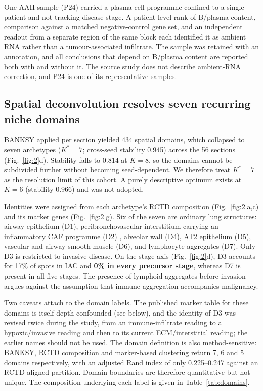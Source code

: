 One AAH sample (P24) carried a plasma-cell programme confined to a single patient and not
tracking disease stage. A patient-level rank of B/plasma content, comparison against a
matched negative-control gene set, and an independent readout from a separate region of the
same block each identified it as ambient RNA rather than a tumour-associated infiltrate. The
sample was retained with an annotation, and all conclusions that depend on B/plasma content
are reported both with and without it. The source study does not describe ambient-RNA
correction, and P24 is one of its representative samples.



\subsection{Spatial deconvolution resolves seven recurring niche domains}

BANKSY applied per section yielded 434 spatial domains, which collapsed to seven archetypes
($K^{*}=7$; cross-seed stability 0.945) across the 56 sections (Fig.~\ref{fig:2}d).
Stability falls to 0.814 at $K=8$, so the domains cannot be subdivided further without
becoming seed-dependent. We therefore treat $K^{*}=7$ as the resolution limit of this
cohort. A purely descriptive optimum exists at $K=6$ (stability 0.966) and was not adopted.

Identities were assigned from each archetype's RCTD composition (Fig.~\ref{fig:2}a,c) and
its marker genes (Fig.~\ref{fig:2}g). Six of the seven are ordinary lung structures: airway
epithelium (D1), peribronchovascular interstitium carrying an inflammatory CAF programme
(D2) \citep{ohllund2017,elyada2019}, alveolar wall (D4), AT2 epithelium (D5), vascular and
airway smooth muscle (D6), and lymphocyte aggregates (D7). Only D3 is restricted to
invasive disease. On the stage axis (Fig.~\ref{fig:2}d), D3 accounts for 17\% of spots in
IAC and \textbf{0\% in every precursor stage}, whereas D7 is present in all five stages.
The presence of lymphoid aggregates before invasion argues against the assumption that
immune aggregation accompanies malignancy.

Two caveats attach to the domain labels. The published marker table for these domains is
itself depth-confounded (see below), and the identity of D3 was revised twice during the
study, from an immune-infiltrate reading to a hypoxic/invasive reading and then to its
current ECM/interstitial reading; the earlier names should not be used. The domain
definition is also method-sensitive: BANKSY, RCTD composition and marker-based clustering
return 7, 6 and 5 domains respectively, with an adjusted Rand index of only 0.225--0.247
against an RCTD-aligned partition. Domain boundaries are therefore quantitative but not
unique. The composition underlying each label is given in Table~\ref{tab:domains}.

